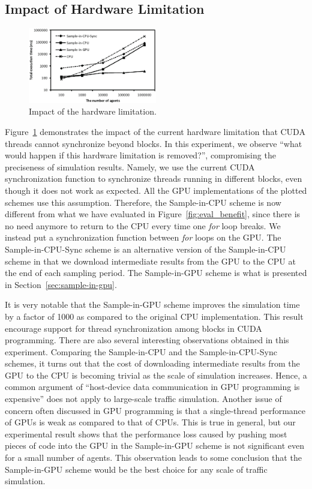 \documentclass[times, 10pt, twocolumn]{article}
\begin{document}
\subsection{Impact of Hardware Limitation}

\begin{figure}[t]
\centering
\includegraphics[width=0.5\textwidth]{eps/eval_nosync.eps}
\caption{Impact of the hardware limitation.}
\label{fig:eval_nosync}
\end{figure}

Figure~\ref{fig:eval_nosync} demonstrates the impact of the current
hardware limitation that CUDA threads cannot synchronize beyond blocks.
In this experiment, we observe ``what would happen if this hardware
limitation is removed?'', compromising the preciseness of simulation
results.
Namely, we use the current CUDA synchronization function to synchronize
threads running in different blocks, even though it does not work as
expected.
All the GPU implementations of the plotted schemes use this assumption.
Therefore, the Sample-in-CPU scheme is now different from what we have
evaluated in Figure~\ref{fig:eval_benefit}, since there is no need
anymore to return to the CPU every time one \textit{for} loop breaks.
We instead put a synchronization function between \textit{for} loops on
the GPU.
The Sample-in-CPU-Sync scheme is an alternative version of the
Sample-in-CPU scheme in that we download intermediate results from the
GPU to the CPU at the end of each sampling period.
The Sample-in-GPU scheme is what is presented in
Section~\ref{sec:sample-in-gpu}.

It is very notable that the Sample-in-GPU scheme improves the simulation
time by a factor of 1000 as compared to the original CPU implementation.
This result encourage support for thread synchronization among blocks in
CUDA programming.
There are also several interesting observations obtained in this
experiment.
Comparing the Sample-in-CPU and the Sample-in-CPU-Sync schemes, it turns
out that the cost of downloading intermediate results from the GPU to
the CPU is becoming trivial as the scale of simulation increases.
Hence, a common argument of ``host-device data communication in GPU
programming is expensive'' does not apply to large-scale traffic
simulation.
Another issue of concern often discussed in GPU programming is that
a single-thread performance of GPUs is weak as compared to that of CPUs.
This is true in general, but our experimental result shows that the
performance loss caused by pushing most pieces of code into the GPU in
the Sample-in-GPU scheme is not significant even for a small number of
agents.
This observation leads to some conclusion that the Sample-in-GPU scheme
would be the best choice for any scale of traffic simulation.
\end{document}
